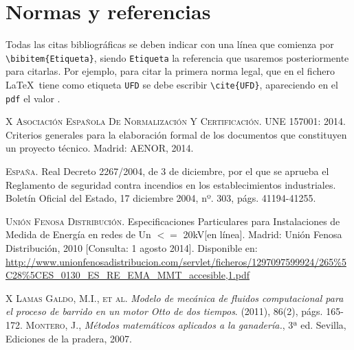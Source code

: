 \documentclass[10pt,a4paper]{article}
\begin{document}
\vspace{1cm}


\section{Normas y referencias}



Todas las citas bibliográficas se deben indicar con una línea que comienza por \verb/\bibitem{Etiqueta}/, siendo \verb/Etiqueta/ la referencia que usaremos posteriormente para citarlas. Por ejemplo, para citar la primera norma legal, que en el fichero \LaTeX \ tiene como etiqueta {\tt UFD} se debe escribir \verb/\cite{UFD}/, apareciendo en el {\tt pdf} el valor \cite{UFD}.


\renewcommand\bibname{Disposiciones legales y normas aplicadas}


\begin{thebibliography}{X}%
 \textsc{Asociación Española De Normalización Y Certificación}. UNE 157001: 2014. 
Criterios generales para la elaboración formal de los documentos que constituyen un proyecto técnico. Madrid: AENOR, 2014.

 \textsc{España}. Real Decreto 2267/2004, de 3 de diciembre, por el que se aprueba el Reglamento de seguridad contra incendios en los establecimientos industriales. Boletín Oficial del Estado, 17 diciembre 2004, nº. 303, págs. 41194-41255.

 \textsc{Unión Fenosa Distribución}. Especificaciones Particulares para Instalaciones de Medida de Energía en redes de Un $<=$ 20kV[en línea]. Madrid: Unión Fenosa Distribución, 2010 [Consulta: 1 agosto 2014]. Disponible en: 
\url{http://www.unionfenosadistribucion.com/servlet/ficheros/1297097599924/265\%5C28\%5CES_0130_ES_RE_EMA_MMT_accesible,1.pdf}
\setcounter{contador}{\value{enumiv}}
\end{thebibliography}

\renewcommand\bibname{Bibliografía}

\begin{thebibliography}{X}%
\setcounter{enumiv}{\value{contador}}
 \textsc{Lamas Galdo, M.I., et al.} \emph{Modelo de mecánica de fluidos computacional para el proceso de barrido en un motor Otto de dos tiempos}. (2011), 86(2), págs. 165-172.
 \textsc{Montero, J.}, \emph{Métodos matemáticos aplicados a la ganadería.}, 3ª ed. Sevilla, Ediciones de la pradera, 2007.


\setcounter{contador}{\value{enumiv}}
\end{thebibliography}
\end{document}
